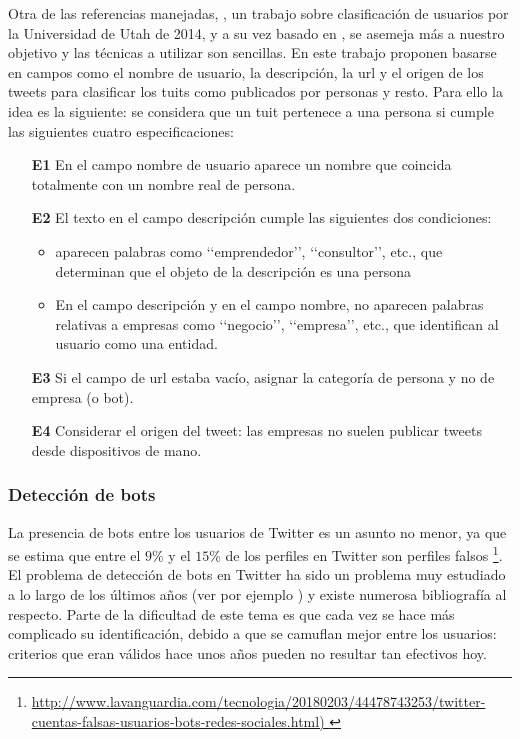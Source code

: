 Otra de las
referencias manejadas, \cite{user_class}, un trabajo sobre clasificación de usuarios
por la Universidad de Utah de 2014, y a su vez basado en \cite{user_class7}, se asemeja
más a nuestro objetivo y las técnicas a utilizar son sencillas.
En este trabajo proponen basarse en campos como el nombre de usuario, 
la descripción, la url y el origen de los tweets para clasificar los tuits como publicados por personas 
y resto. Para ello la idea es la siguiente: se considera que un tuit pertenece a una persona si 
cumple las siguientes cuatro especificaciones:
\begin{itemize}
\item[{\bf E1}] En el campo nombre de usuario aparece un nombre que coincida totalmente con 
un nombre real de persona. 
\item[{\bf E2}]El texto en el campo descripción cumple las siguientes dos condiciones:
\begin{itemize}
\item aparecen palabras como \lq\lq emprendedor\rq\rq, \lq\lq consultor\rq\rq, etc.,
que determinan que el objeto de la descripción es una persona
\item En el campo descripción y en el campo nombre, no aparecen palabras relativas a empresas como 
\lq\lq negocio\rq\rq, \lq\lq empresa\rq\rq, etc., que identifican al usuario como una entidad.
\end{itemize}
\item[{\bf E3}] Si el campo de url estaba vacío, asignar la categoría de persona y no de empresa (o bot).
\item[{\bf E4}] Considerar el origen del tweet: las empresas no suelen publicar tweets desde dispositivos de mano. 
\end{itemize}

\subsubsection{Detección de bots}
La presencia de bots entre los usuarios de Twitter es un asunto no menor,  ya que
se estima que entre el $9$\% y el $15$\% de los perfiles en Twitter son
perfiles falsos
\footnote{\url{http://www.lavanguardia.com/tecnologia/20180203/44478743253/twitter-cuentas-falsas-usuarios-bots-redes-sociales.html)  }}. 
El problema de detección de bots en Twitter ha sido un problema muy estudiado
a lo largo de los últimos años (ver por ejemplo \cite{user_class4}) y existe numerosa 
bibliografía al respecto.
Parte de la dificultad de este tema es que cada vez se hace más complicado su identificación,
debido a que se camuflan mejor entre los usuarios: criterios que eran válidos hace unos años pueden
no resultar tan efectivos hoy. 

